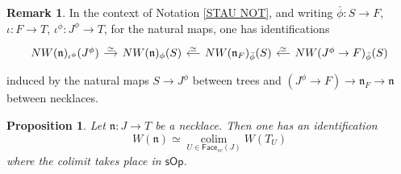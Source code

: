 \documentclass[a4paper,10pt]{article}%
\numberwithin{equation}{section}
\numberwithin{figure}{section}
\newtheorem{proposition}[equation]{Proposition}%
\theoremstyle{definition} %
\newtheorem{remark}[equation]{Remark}%
\DeclareMathOperator{\colim}{colim}
\begin{document}
\begin{remark}\label{STAU REM}
	In the context of Notation \ref{STAU NOT},
	and writing 
	$\bar{\phi} \colon S \to F$,
	$\iota \colon F \to T$,
	$\iota^{\phi} \colon J^{\phi} \to T$,
	for the natural maps,
	one has identifications
	\begin{equation}
	\begin{tikzcd}[column sep = 12pt]
	NW(\mathfrak{n})_{\iota^{\phi}}(J^{\phi}) 
	\ar{r}{\simeq}
	&
	NW(\mathfrak{n})_{\phi}(S)
	&
	NW(\mathfrak{n}_F)_{\bar{\phi}}(S)
	\ar{l}[swap]{\simeq}
	&
	NW(J^{\phi} \to F)_{\bar{\phi}}(S)
	\ar{l}[swap]{\simeq}
	\end{tikzcd}
	\end{equation}
	induced by the natural maps
	$S \to J^{\phi}$ between trees and 
	$(J^{\phi} \to F) \to
	\mathfrak{n}_F \to \mathfrak{n}$
	between necklaces.
\end{remark}




\begin{proposition}\label{NECKCOL PROP}
	Let $\mathfrak{n} \colon J \to T$ be a necklace.
	Then one has an identification
	\begin{equation}\label{NECKCOL EQ}
	W(\mathfrak{n})
	\simeq 
	\underset{U \in \mathsf{Face}_{sc}(J)}{\colim}
	W(T_U)
	\end{equation}
	where the colimit takes place 
	in $\mathsf{sOp}$.
\end{proposition}
\end{document}
